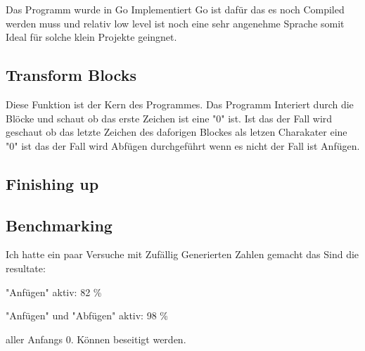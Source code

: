 \documentclass{article}
\begin{document}
Das Programm wurde in Go Implementiert Go ist dafür das es noch Compiled werden muss und relativ low level ist noch eine sehr angenehme Sprache somit Ideal für solche klein Projekte geingnet.

\subsection{Transform Blocks}

Diese Funktion ist der Kern des Programmes. Das Programm Interiert durch die Blöcke und schaut ob das erste Zeichen ist eine "0" ist. Ist das der Fall wird geschaut ob das letzte Zeichen des daforigen Blockes als letzen Charakater eine "0" ist das der Fall wird Abfügen durchgeführt wenn es nicht der Fall ist Anfügen.


\subsection{Finishing up}


\subsection{Benchmarking}

Ich hatte ein paar Versuche mit Zufällig Generierten Zahlen gemacht das Sind die resultate:

"Anfügen" aktiv: 82 \%

"Anfügen" und "Abfügen" aktiv:  98 \%

aller Anfangs 0. Können beseitigt werden.
\end{document}
